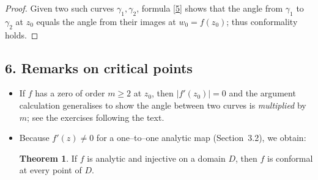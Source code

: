 \documentclass[12pt]{article}
\theoremstyle{definition} %
\newtheorem{theorem}{Theorem}
\theoremstyle{plain} %
\begin{document}
\begin{proof}
Given two such curves $\gamma_{1},\gamma_{2}$, formula \eqref{5} shows that
the angle from $\gamma_{1}$ to $\gamma_{2}$ at $z_{0}$ equals the angle from
their images at $w_{0}=f(z_{0})$; thus conformality holds.
\end{proof}

\subsection*{6.\;  Remarks on critical points}

\begin{itemize}
\item If $f$ has a zero of order $m\ge2$ at $z_{0}$, then $|f'(z_{0})|=0$ and
      the argument calculation generalises to show the angle between two
      curves is \emph{multiplied} by $m$; see the exercises following the
      text.
\item Because $f'(z)\neq0$ for a one--to--one analytic map (Section~3.2),
      we obtain:

      \begin{theorem}
      If $f$ is analytic and injective on a domain $D$, then $f$ is conformal
      at every point of $D$.
      \end{theorem}
\end{itemize}
\end{document}
